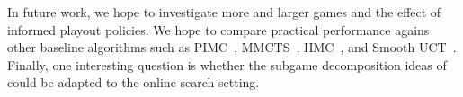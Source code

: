 \documentclass{aamas2015}
\newcounter{vlNoteCounter}
\newcommand{\vlnote}[1]{{\scriptsize \color{blue} $\blacksquare$ \refstepcounter{vlNoteCounter}\textsf{[VL]$_{\arabic{vlNoteCounter}}$:{#1}}}}
\renewcommand{\vlnote}[1]{}
\begin{document}
In future work, we hope to investigate more and larger games and the effect of informed playout policies. 
We hope to compare practical performance agains other baseline algorithms such as 
PIMC~\cite{Long10Understanding}, MMCTS~\cite{Auger11Multiple}, IIMC~\cite{Furtak13Recursive}, and Smooth UCT~\cite{Heinrich14}.
Finally, one interesting question is whether the subgame decomposition ideas of~\cite{Burch14Solving,Jackson14} could be 
adapted to the online search setting. 



%

%
%
\end{document}
